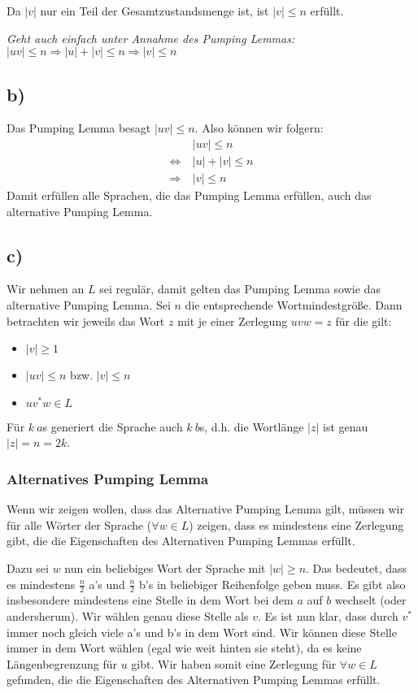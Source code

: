 \documentclass{article}
\begin{document}
Da $|v|$ nur ein Teil der Gesamtzustandsmenge ist, ist $|v| \leq n$ erfüllt.

\vspace{1em} \textit{Geht auch einfach unter Annahme des Pumping Lemmas: \\$|uv|\leq n \Rightarrow |u|+|v|\leq n \Rightarrow |v| \leq n$}


\subsection*{b)}
Das Pumping Lemma besagt $|uv| \leq n$. Also können wir folgern:
\setcounter{equation}{0}
\begin{align}
                 & |uv| \leq n \\
\Leftrightarrow\ & |u|+|v| \leq n \\
\Rightarrow    \ & |v| \leq n
\end{align}
Damit erfüllen alle Sprachen, die das Pumping Lemma erfüllen, auch das alternative Pumping Lemma.


\subsection*{c)}
Wir nehmen an $L$ sei regulär, damit gelten das Pumping Lemma sowie das alternative Pumping Lemma. Sei $n$ die entsprechende Wortmindestgröße. Dann betrachten wir jeweils das Wort $z$ mit je einer Zerlegung $uvw=z$ für die gilt:

\begin{itemize}
	\item $|v| \geq 1$
	\item $|uv| \leq n$ bzw. $|v| \leq n$
	\item $uv^*w \in L$
\end{itemize}

Für $k\ a$s generiert die Sprache auch $k\ b$s, d.h. die Wortlänge $|z|$ ist genau $|z| = n = 2k$.

\subsubsection*{Alternatives Pumping Lemma}
Wenn wir zeigen wollen, dass das Alternative Pumping Lemma gilt, müssen wir für alle Wörter der Sprache ($\forall w \in L$) zeigen, dass es mindestens eine Zerlegung gibt, die die Eigenschaften des Alternativen Pumping Lemmas erfüllt.

Dazu sei $w$ nun ein beliebiges Wort der Sprache mit $|w|\geq n$. Das bedeutet, dass es mindestens $\frac{n}{2}$ a's und $\frac{n}{2}$ b's in beliebiger Reihenfolge geben muss. Es gibt also insbesondere mindestens eine Stelle in dem Wort bei dem $a$ auf $b$ wechselt (oder andersherum). Wir wählen genau diese Stelle als $v$. Es ist nun klar, dass durch $v^*$ immer noch gleich viele a's und b's in dem Wort sind. Wir können diese Stelle immer in dem Wort wählen (egal wie weit hinten sie steht), da es keine Längenbegrenzung für $u$ gibt. Wir haben somit eine Zerlegung für $\forall w \in L$ gefunden, die die Eigenschaften des Alternativen Pumping Lemmas erfüllt.
\end{document}
